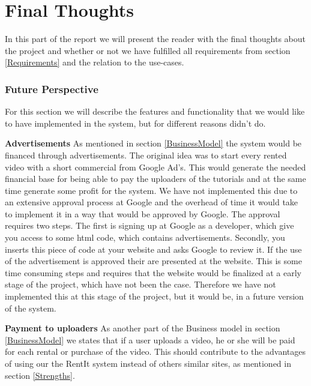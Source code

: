 \part{Final Thoughts}
In this part of the report we will present the reader with the final thoughts about the project and whether or not we have fulfilled all requirements from section \ref{Requirements} and the relation to the use-cases.

\section{Future Perspective}
For this section we will describe the features and functionality that we would like to have implemented in the system, but for different reasons didn't do. 

\textbf{Advertisements}
As mentioned in section \ref{BusinessModel} the system would be financed through advertisements. The original idea was to start every rented video with a short commercial from Google Ad's. This would generate the needed financial base for being able to pay the uploaders of the tutorials and at the same time generate some profit for the system. We have not implemented this due to an extensive approval process at Google and the overhead of time it would take to implement it in a way that would be approved by Google. The approval requires two steps. The first is signing up at Google as a developer, which give you access to some html code, which contains advertisements. Secondly, you inserts this piece of code at your website and asks Google to review it. If the use of the advertisement is approved their are presented at the website.  This is some time consuming steps and requires that the website would be finalized at a early stage of the project, which have not been the case. Therefore we have not implemented this at this stage of the project, but it would be, in a future version of the system. 

\textbf{Payment to uploaders}
As another part of the Business model in section \ref{BusinessModel} we states that if a user uploads a video, he or she will be paid for each rental or purchase of the video. This should contribute to the advantages of using our the RentIt system instead of others similar sites, as mentioned in section \ref{Strengths}. 
 